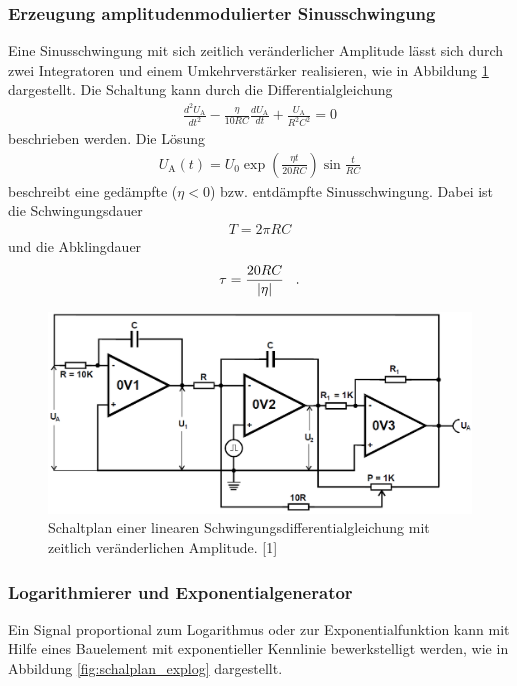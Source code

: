 \documentclass[]{scrartcl}
\begin{document}
\subsubsection{Erzeugung amplitudenmodulierter Sinusschwingung}
Eine Sinusschwingung mit sich zeitlich veränderlicher Amplitude lässt sich durch zwei Integratoren und einem Umkehrverstärker realisieren, wie in Abbildung \ref{fig:schalplan_schwingung} dargestellt.
Die Schaltung kann durch die Differentialgleichung
\begin{align}
\frac{d^2 U_\text{A}}{dt^2}-\frac{\eta}{10 RC} \frac{d U_\text{A}}{dt}+\frac{U_\text{A}}{R^2C^2}=0
\end{align}
beschrieben werden. Die Lösung 
\begin{align}
U_\text{A}\left(t\right)=U_0\exp \left(\frac{\eta t}{20 RC}\right)\sin \frac{t}{RC}
\end{align}
beschreibt eine gedämpfte ($\eta < 0$) bzw. entdämpfte Sinusschwingung. Dabei ist die Schwingungsdauer
\begin{align}
T=2\pi RC
\end{align}
und die Abklingdauer
\begin{align}
\tau=\frac{20RC}{\left|\eta \right| }\hspace{0.3cm}\text{.}
\end{align}
\begin{figure}[H]
\centering
\includegraphics[width=13cm]{images/schaltplan_schwingung.png}
\caption{Schaltplan einer linearen Schwingungsdifferentialgleichung mit zeitlich veränderlichen Amplitude. [1]}
\label{fig:schalplan_schwingung}
\end{figure}
\subsubsection{Logarithmierer und Exponentialgenerator}
Ein Signal proportional zum Logarithmus oder zur Exponentialfunktion kann mit Hilfe eines Bauelement mit exponentieller Kennlinie bewerkstelligt werden, wie in Abbildung \ref{fig:schalplan_explog} dargestellt.
\end{document}
